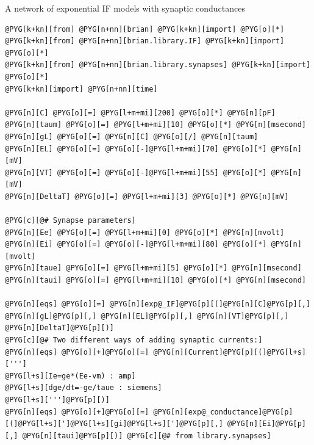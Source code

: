 \documentclass[letterpaper,10pt,english]{manual}
\begin{document}
A network of exponential IF models with synaptic conductances

\begin{Verbatim}[commandchars=@\[\]]
@PYG[k+kn][from] @PYG[n+nn][brian] @PYG[k+kn][import] @PYG[o][*]
@PYG[k+kn][from] @PYG[n+nn][brian.library.IF] @PYG[k+kn][import] @PYG[o][*]
@PYG[k+kn][from] @PYG[n+nn][brian.library.synapses] @PYG[k+kn][import] @PYG[o][*]
@PYG[k+kn][import] @PYG[n+nn][time]

@PYG[n][C] @PYG[o][=] @PYG[l+m+mi][200] @PYG[o][*] @PYG[n][pF]
@PYG[n][taum] @PYG[o][=] @PYG[l+m+mi][10] @PYG[o][*] @PYG[n][msecond]
@PYG[n][gL] @PYG[o][=] @PYG[n][C] @PYG[o][/] @PYG[n][taum]
@PYG[n][EL] @PYG[o][=] @PYG[o][-]@PYG[l+m+mi][70] @PYG[o][*] @PYG[n][mV]
@PYG[n][VT] @PYG[o][=] @PYG[o][-]@PYG[l+m+mi][55] @PYG[o][*] @PYG[n][mV]
@PYG[n][DeltaT] @PYG[o][=] @PYG[l+m+mi][3] @PYG[o][*] @PYG[n][mV]

@PYG[c][@# Synapse parameters]
@PYG[n][Ee] @PYG[o][=] @PYG[l+m+mi][0] @PYG[o][*] @PYG[n][mvolt]
@PYG[n][Ei] @PYG[o][=] @PYG[o][-]@PYG[l+m+mi][80] @PYG[o][*] @PYG[n][mvolt]
@PYG[n][taue] @PYG[o][=] @PYG[l+m+mi][5] @PYG[o][*] @PYG[n][msecond]
@PYG[n][taui] @PYG[o][=] @PYG[l+m+mi][10] @PYG[o][*] @PYG[n][msecond]

@PYG[n][eqs] @PYG[o][=] @PYG[n][exp@_IF]@PYG[p][(]@PYG[n][C]@PYG[p][,] @PYG[n][gL]@PYG[p][,] @PYG[n][EL]@PYG[p][,] @PYG[n][VT]@PYG[p][,] @PYG[n][DeltaT]@PYG[p][)]
@PYG[c][@# Two different ways of adding synaptic currents:]
@PYG[n][eqs] @PYG[o][+]@PYG[o][=] @PYG[n][Current]@PYG[p][(]@PYG[l+s][''']
@PYG[l+s][Ie=ge*(Ee-vm) : amp]
@PYG[l+s][dge/dt=-ge/taue : siemens]
@PYG[l+s][''']@PYG[p][)]
@PYG[n][eqs] @PYG[o][+]@PYG[o][=] @PYG[n][exp@_conductance]@PYG[p][(]@PYG[l+s][']@PYG[l+s][gi]@PYG[l+s][']@PYG[p][,] @PYG[n][Ei]@PYG[p][,] @PYG[n][taui]@PYG[p][)] @PYG[c][@# from library.synapses]


\end{Verbatim}
\end{document}
